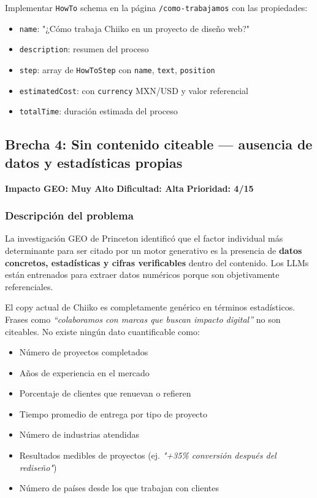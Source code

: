 \documentclass[12pt, a4paper]{article}
\begin{document}
Implementar \texttt{HowTo} schema en la página \texttt{/como-trabajamos} con las propiedades:
\begin{itemize}[itemsep=3pt]
  \item \texttt{name}: "¿Cómo trabaja Chiiko en un proyecto de diseño web?"
  \item \texttt{description}: resumen del proceso
  \item \texttt{step}: array de \texttt{HowToStep} con \texttt{name}, \texttt{text}, \texttt{position}
  \item \texttt{estimatedCost}: con \texttt{currency} MXN/USD y valor referencial
  \item \texttt{totalTime}: duración estimada del proceso
\end{itemize}

\subsection{Brecha 4: Sin contenido citeable — ausencia de datos y estadísticas propias}

\begin{criticalbox}
\textbf{Impacto GEO: Muy Alto} \quad \textbf{Dificultad: Alta} \quad \textbf{Prioridad: 4/15}
\end{criticalbox}

\subsubsection{Descripción del problema}

La investigación GEO de Princeton identificó que el factor individual más determinante para ser citado por un motor generativo es la presencia de \textbf{datos concretos, estadísticas y cifras verificables} dentro del contenido. Los LLMs están entrenados para extraer datos numéricos porque son objetivamente referenciales.

El copy actual de Chiiko es completamente genérico en términos estadísticos. Frases como \textit{``colaboramos con marcas que buscan impacto digital''} no son citeables. No existe ningún dato cuantificable como:

\begin{itemize}[itemsep=3pt]
  \item Número de proyectos completados
  \item Años de experiencia en el mercado
  \item Porcentaje de clientes que renuevan o refieren
  \item Tiempo promedio de entrega por tipo de proyecto
  \item Número de industrias atendidas
  \item Resultados medibles de proyectos (ej. \textit{"+35\% conversión después del rediseño"})
  \item Número de países desde los que trabajan con clientes
\end{itemize}
\end{document}
